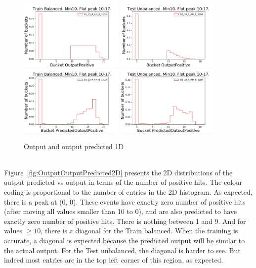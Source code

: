 \begin{figure}[t]
\centering
\includegraphics[width=0.45\textwidth]{plots/plot_02_1_overlay_histo_OutputPositive_Train.pdf}
\includegraphics[width=0.45\textwidth]{plots/plot_02_1_overlay_histo_OutputPositive_Test.pdf}\\
\includegraphics[width=0.45\textwidth]{plots/plot_02_1_overlay_histo_PredictedOutputPositive_Train.pdf}
\includegraphics[width=0.45\textwidth]{plots/plot_02_1_overlay_histo_PredictedOutputPositive_Test.pdf}\\
\caption{Output and output predicted 1D}
\label{fig:OutputOutputPredicted1D}
\end{figure}

\ \\Figure~\ref{fig:OutputOutputPredicted2D} presents the 2D distributions of the output predicted vs output in terms of the number of positive hits. The colour coding is proportional to the number of entries in the 2D histogram. As expected, there is a peak at (0, 0). These events have exactly zero number of positive hits (after moving all values smaller than 10 to 0), and are also predicted to have exactly zero number of positive hits. There is nothing between 1 and 9. And for values $\ge 10$, there is a diagonal for the Train balanced. When the training is accurate, a diagonal is expected because the predicted output will be similar to the actual output. For the Test unbalanced, the diagonal is harder to see. But indeed most entries are in the top left corner of this region, as expected.

